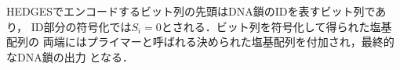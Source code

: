 \documentclass[sotsuron]{kuee}
\begin{document}

HEDGESでエンコードするビット列の先頭はDNA鎖のIDを表すビット列であり，
ID部分の符号化では$S_i=0$とされる．ビット列を符号化して得られた塩基配列の
両端にはプライマーと呼ばれる決められた塩基配列を付加され，最終的なDNA鎖の出力
となる．
\end{document}
